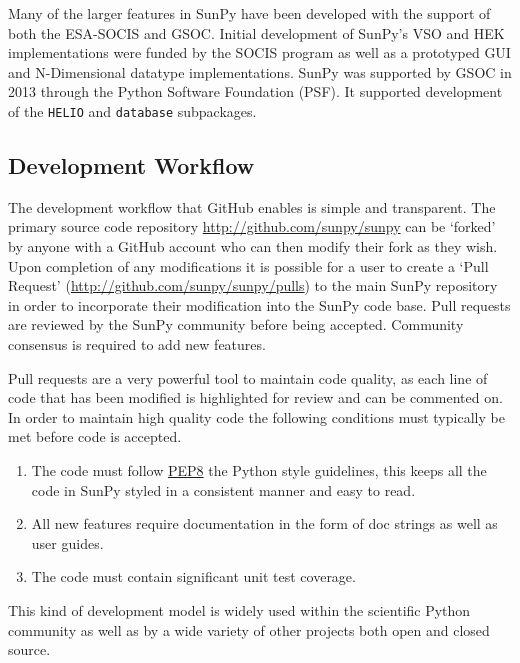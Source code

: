 Many of the larger features in SunPy have been developed 
with the support of both the ESA-SOCIS and GSOC. 
Initial development of SunPy's VSO and HEK 
implementations were funded by the SOCIS program as well as a prototyped GUI 
and N-Dimensional datatype implementations. SunPy was supported by GSOC in 2013 
through the Python Software Foundation (PSF). It supported development of the 
\texttt{HELIO} and 
\texttt{database} subpackages.

\subsection{Development Workflow}
The development workflow that GitHub enables is simple and transparent. The 
primary source code repository \url{http://github.com/sunpy/sunpy} can be 
`forked' by anyone with a GitHub account who can then modify their fork as they 
wish. Upon completion of any modifications it is possible for a user to create 
a `Pull Request' (\url{http://github.com/sunpy/sunpy/pulls}) to the main SunPy 
repository in order to incorporate their modification into the SunPy code base. 
Pull requests are reviewed by the SunPy community before being accepted. Community consensus
is required to add new features.

Pull requests are a very powerful tool to maintain code quality, as each line 
of code that has been modified is highlighted for review and can be commented on. 
In order to maintain high quality code the following conditions must typically be met 
before code is accepted.

\begin{enumerate}
	\item  The code must follow 	
	\href{http://www.python.org/dev/peps/pep-0008/}{PEP8} the Python style 
	guidelines, this keeps all the code in SunPy styled in a consistent manner and easy to read.
	
	\item All new features require documentation in the form of doc strings as well as user
	guides. 
	
	\item The code must contain significant unit test coverage.
\end{enumerate}

This kind of development model is widely used within the scientific Python 
community as well as by a wide variety of other projects both open and closed 
source.
